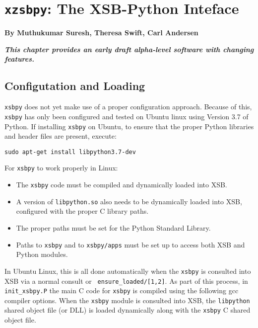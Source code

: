 
\chapter[XSB and Python]{{\tt xzsbpy}: The XSB-Python Inteface}

\begin{center}
  {\Large {\bf By Muthukumar Suresh, Theresa Swift, Carl Andersen}}
\end{center}

\noindent
{\large {\bf {\em This chapter provides an early draft alpha-level
      software with changing features.}}}

%


\section{Configutation and Loading}

{\tt xsbpy} does not yet make use of a proper configuration approach.
Because of this, {\tt xsbpy} has only been configured and tested on
Ubuntu linux using Version 3.7 of Python.  If installing {\tt xsbpy}
on Ubuntu, to ensure that the proper Python libraries and header files
are present, execute:

{\tt sudo apt-get install libpython3.7-dev}



For {\tt xsbpy} to work properly in Linux:
\begin{itemize}
\item The {\tt xsbpy} code must be compiled and dynamically loaded into XSB.
\item A version of {\tt libpython.so} also needs to be dynamically
  loaded into XSB, configured with the proper C library paths.
\item The proper paths must be set for the Python Standard Library.
\item Paths to {\tt xsbpy} and to {\tt xsbpy/apps} must be set up to
  access both XSB and Python modules.
\end{itemize}

In Ubuntu Linux, this is all done automatically when the {\tt xsbpy}
is consulted into XSB via a normal consult or {\tt
  ensure\_loaded/[1,2]}.  As part of this process, in {\tt
  init\_xsbpy.P} the main C code for {\tt xsbpy} is compiled using the
following gcc compiler options.  When the {\tt xsbpy} module is
consulted into XSB, the {\tt libpython} shared object file (or DLL) is
loaded dynamically along with the {\tt xsbpy} C shared object file.

